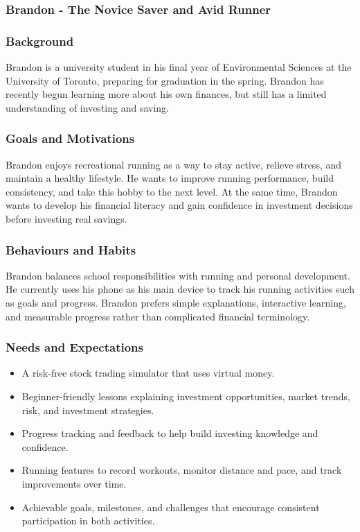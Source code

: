 \documentclass[12pt]{article}
\begin{document}
\subsubsection{Brandon - The Novice Saver and Avid Runner}

\subsubsection*{Background}
Brandon is a university student in his final year of Environmental Sciences at the University of Toronto, preparing for graduation in the spring. Brandon has recently begun learning more about his own finances, but still has a limited understanding of investing and saving.

\subsubsection*{Goals and Motivations}
Brandon enjoys recreational running as a way to stay active, relieve stress, and maintain a healthy lifestyle. He wants to improve running performance, build consistency, and take this hobby to the next level. At the same time, Brandon wants to develop his financial literacy and gain confidence in investment decisions before investing real savings.

\subsubsection*{Behaviours and Habits}
Brandon balances school responsibilities with running and personal development. He currently uses his phone as his main device to track his running activities such as goals and progress. Brandon prefers simple explanations, interactive learning, and measurable progress rather than complicated financial terminology.

\subsubsection*{Needs and Expectations}
\begin{itemize}
    \item A risk-free stock trading simulator that uses virtual money.
    \item Beginner-friendly lessons explaining investment opportunities, market trends, risk, and investment strategies.
    \item Progress tracking and feedback to help build investing knowledge and confidence.
    \item Running features to record workouts, monitor distance and pace, and track improvements over time.
    \item Achievable goals, milestones, and challenges that encourage consistent participation in both activities.
\end{itemize}
\end{document}
